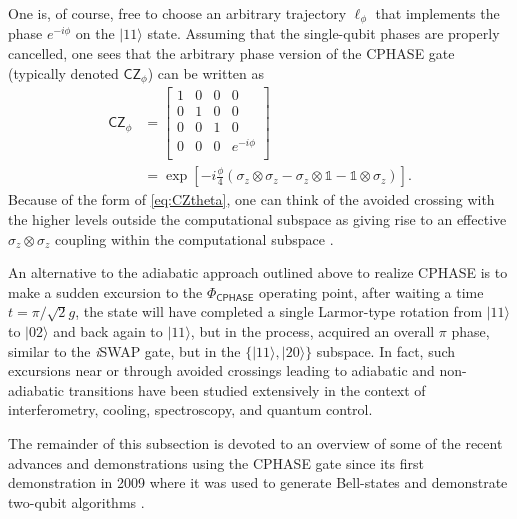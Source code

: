 \documentclass[aip,apr,twocolumn,showpacs,superscriptaddress,groupedaddress,nofootinbib,reprint]{revtex4-1}  %
\newcommand{\Id}{\mathds{1}}
\newcommand{\iSWAP}{\emph{i}\textsf{SWAP}}
\newcommand{\CPHASE}{\textsf{CPHASE}}
\begin{document}
One is, of course, free to choose an arbitrary trajectory $\ell_\phi$ that implements the phase $e^{-i\phi}$ on the $|11\rangle$ state. Assuming that the single-qubit phases are properly cancelled, one sees that the arbitrary phase version of the \CPHASE{} gate (typically denoted $\textsf{CZ}_\phi$) can be written as
\begin{align}
\textsf{CZ}_\phi &= \begin{bmatrix}
1 & 0 & 0 & 0 \\
0 & 1 & 0 & 0 \\
0 & 0 & 1 & 0 \\
0 & 0 & 0 & e^{-i\phi} \nonumber
\\
\end{bmatrix} \\
& = \exp\left[-i\frac{\phi}{4}\left(\sigma_z\otimes \sigma_z-\sigma_z\otimes \Id - \Id \otimes \sigma_z\right)\right]. \label{eq:CZtheta}
\end{align}
Because of the form of \cref{eq:CZtheta}, one can think of the avoided crossing with the higher levels outside the computational subspace as giving rise to an effective $\sigma_z\otimes \sigma_z$ coupling within the computational subspace \cite{Strauch2003}.

An alternative to the adiabatic approach outlined above to realize \CPHASE{} is to make a sudden excursion to the $\Phi_{\CPHASE{}}$ operating point, after waiting a time $t=\pi/\sqrt{2}g$, the state will have completed a single Larmor-type rotation from $|11\rangle$ to $|02\rangle$ and back again to $|11\rangle$, but in the process, acquired an overall $\pi$ phase, similar to the \iSWAP{} gate, but in the $\{|11\rangle, |20\rangle\}$ subspace\cite{DiCarlo2010}. In fact, such excursions near or through avoided crossings leading to adiabatic and non-adiabatic transitions have been studied extensively in the context of interferometry, cooling, spectroscopy, and quantum control\cite{Oliver2005,Berns2006,Valenzuela2006,Ashhab2007,Berns2008,Rudner2008,You2008,Grajcar2008,Bylander2009,Oliver2009,Shevchenko2010}.

The remainder of this subsection is devoted to an overview of some of the recent advances and demonstrations using the \CPHASE{} gate since its first demonstration in 2009 where it was used to generate Bell-states and demonstrate two-qubit algorithms \cite{DiCarlo2009}.
\end{document}
